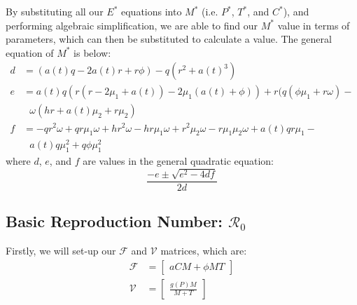 \documentclass[12pt]{article}
\begin{document}
    By substituting all our $E^{*}$ equations into $M^{*}$ (i.e. $P^{*}$, $T^{*}$, and $C^{*}$), and performing algebraic simplification, we are able to find our $M^{*}$ value in terms of parameters, which can then be substituted to calculate a value. The general equation of $M^{*}$ is below:
    \begin{align*}
        d &= (a(t)q-2a(t)r+r \phi ) - q(r^{2}+a(t)^{3})\\
        e &= a(t)q(r(r-2\mu_{1}+a(t))-2\mu_{1}(a(t)+\phi )) +  r(q(\phi \mu_{1} + r \omega ) - \\ & \ \ \  \omega(hr+a(t) \mu_{2} + r\mu_{2})\\
        f &= -qr^{2} \omega +qr\mu_{1} \omega + hr^{2} \omega - hr\mu_{1} \omega + r^2 \mu_{2} \omega - r \mu_{1} \mu_{2} \omega + a(t)qr \mu_{1} - \\ & \ \ \  a(t)q\mu_{1}^{2} +q\phi \mu_{1}^{2}
    \end{align*}
    where $d$, $e$, and $f$ are values in the general quadratic equation:
    $$\frac{-e \pm \sqrt{e^2 - 4df}}{2d}$$

    \subsection{Basic Reproduction Number: $\mathscr{R}_0$}
        \label{appendix:A3}
        Firstly, we will set-up our $\mathscr{F}$ and $\mathscr{V}$ matrices, which are:
        \begin{align*}
            \mathscr{F} &= \begin{bmatrix}
                            aCM + \phi MT
                          \end{bmatrix}\\
            \mathscr{V} &= \begin{bmatrix}
                            \frac{g(P)M}{M+T}
                          \end{bmatrix}              
        \end{align*}
        
\end{document}
